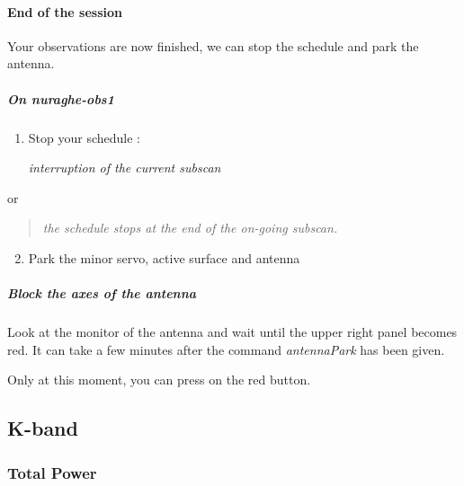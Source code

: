\documentclass[letterpaper,10pt,english]{sphinxmanual}
\begin{document}
\paragraph{End of the session}
\label{Continuum/C-band/SARDARA/stop-session:end-of-the-session}\label{Continuum/C-band/SARDARA/stop-session::doc}
Your observations are now finished, we can stop the schedule and park
the antenna.


\subparagraph{On nuraghe-obs1}
\label{Continuum/C-band/SARDARA/stop-session:on-nuraghe-obs1}\begin{enumerate}
\item {} 
Stop your schedule :

   \emph{interruption of the current subscan}

\end{enumerate}

or
\begin{quote}

    \emph{the schedule stops at the end of the on-going subscan.}
\end{quote}
\begin{enumerate}
\setcounter{enumi}{1}
\item {} 
Park the minor servo, active surface and antenna





\end{enumerate}


\subparagraph{Block the axes of the antenna}
\label{Continuum/C-band/SARDARA/stop-session:block-the-axes-of-the-antenna}
Look at the monitor of the antenna and wait until the upper right
panel becomes red. It can take a few minutes after the command
\emph{antennaPark} has been given.

Only at this moment, you can press on the red button.


\subsection{K-band}
\label{Continuum/K-band/index::doc}\label{Continuum/K-band/index:k-band}

\subsubsection{Total Power}
\label{Continuum/K-band/TP/index:total-power}\label{Continuum/K-band/TP/index::doc}
\end{document}
